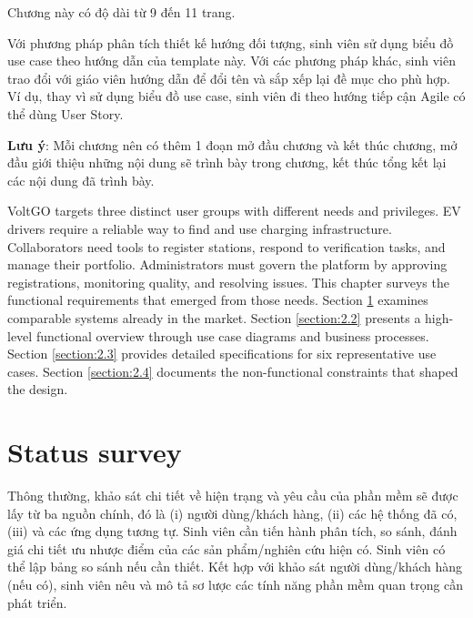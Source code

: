 \documentclass[../Main.tex]{subfiles}
\begin{document}
Chương này có độ dài từ 9 đến 11 trang.

Với phương pháp phân tích thiết kế hướng đối tượng, sinh viên sử dụng biểu đồ use case theo hướng dẫn của template này. Với các phương pháp khác, sinh viên trao đổi với giáo viên hướng dẫn để đổi tên và sắp xếp lại đề mục cho phù hợp. Ví dụ, thay vì sử dụng biểu đồ use case, sinh viên đi theo hướng tiếp cận Agile có thể dùng User Story.


\textbf{Lưu ý}: Mỗi chương nên có thêm 1 đoạn mở đầu chương và kết thúc chương, mở đầu giới thiệu những nội dung sẽ trình bày trong chương, kết thúc tổng kết lại các nội dung đã trình bày.

VoltGO targets three distinct user groups with different needs and privileges. EV drivers require a reliable way to find and use charging infrastructure. Collaborators need tools to register stations, respond to verification tasks, and manage their portfolio. Administrators must govern the platform by approving registrations, monitoring quality, and resolving issues. This chapter surveys the functional requirements that emerged from those needs. Section \ref{section:2.1} examines comparable systems already in the market. Section \ref{section:2.2} presents a high-level functional overview through use case diagrams and business processes. Section \ref{section:2.3} provides detailed specifications for six representative use cases. Section \ref{section:2.4} documents the non-functional constraints that shaped the design.

\section{Status survey}
\label{section:2.1}
Thông thường, khảo sát chi tiết về hiện trạng và yêu cầu của phần mềm sẽ được lấy từ ba nguồn chính, đó là (i) người dùng/khách hàng, (ii) các hệ thống đã có, (iii) và các ứng dụng tương tự.
Sinh viên cần tiến hành phân tích, so sánh, đánh giá chi tiết ưu nhược điểm của các sản phẩm/nghiên cứu hiện có. Sinh viên có thể lập bảng so sánh nếu cần thiết. Kết hợp với khảo sát người dùng/khách hàng (nếu có), sinh viên nêu và mô tả sơ lược các tính năng phần mềm quan trọng cần phát triển.
\end{document}
